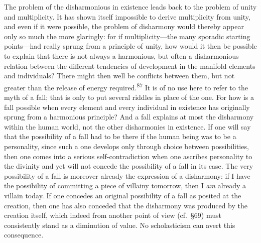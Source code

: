 \documentclass[12pt,a4paper]{book}
\newcommand{\opage}[1]{\marginnote{\footnotesize\textit{[#1]}}}
\begin{document}
The problem of the disharmonious in existence leads back to the problem of unity and multiplicity.
It has shown itself impossible to derive multiplicity from unity, and even if it were possible, the
problem of disharmony would thereby appear only so much the more glaringly: for if multiplicity---the
many sporadic starting points---had really sprung from a principle of unity, how would it then be
possible to explain that there is not always a harmonious, but often a disharmonious relation 
\opage{181}between
the different tendencies of development in the manifold elements and individuals? There might then
well be conflicts between them, but not greater than the release of energy
required.\textsuperscript{87}
It is of no use here to refer to the myth of a fall; that is only to put several riddles in place of
the one. For how is a fall possible when every element and every individual in existence has
originally sprung from a harmonious principle? And a fall explains at most the disharmony within the
human world, not the other disharmonies in existence.
If one will say that the possibility of a fall had to be there if the human being was to be a
personality, since such a one develops only through choice between possibilities, then one comes into
a serious self-contradiction when one ascribes personality to the divinity and yet will not concede
the possibility of a fall in its case. The very possibility of a fall is moreover already the
expression of a disharmony: if I have the possibility of committing a piece of villainy tomorrow, then
I \emph{am} already a villain today. If one concedes an original possibility of a fall as posited at
the creation, then one has also conceded that the disharmony was produced by the creation itself,
which indeed from another point of view (cf.\ §69) must consistently stand as a diminution of value.
No scholasticism can avert this consequence.
\end{document}
